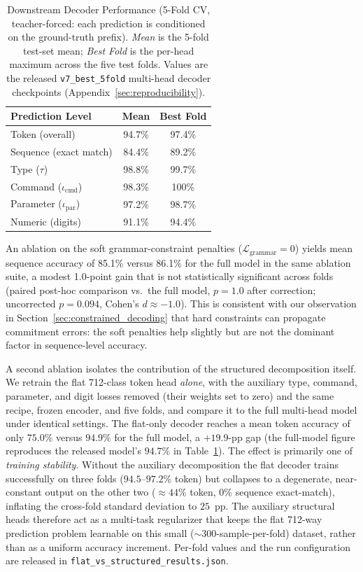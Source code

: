 \documentclass[sensors,article,submit,moreauthors,pdftex]{Definitions/mdpi}
\begin{document}
\begin{table}[htbp]
\centering
\caption{Downstream Decoder Performance (5-Fold CV, teacher-forced: each prediction is conditioned on the ground-truth prefix). \emph{Mean} is the 5-fold test-set mean; \emph{Best Fold} is the per-head maximum across the five test folds. Values are the released \texttt{v7\_best\_5fold} multi-head decoder checkpoints (Appendix~\ref{sec:reproducibility}).}
\label{tab:downstream}
\small
\begin{tabular}{@{}lcc@{}}
\toprule
\textbf{Prediction Level} & \textbf{Mean} & \textbf{Best Fold} \\
\midrule
Token (overall)              & 94.7\% & 97.4\% \\
Sequence (exact match)       & 84.4\% & 89.2\% \\
Type ($\tau$)                & 98.8\% & 99.7\% \\
Command ($\iota_{\text{cmd}}$) & 98.3\% & 100\% \\
Parameter ($\iota_{\text{par}}$) & 97.2\% & 98.7\% \\
Numeric (digits)             & 91.1\% & 94.4\% \\
\bottomrule
\end{tabular}
\normalsize
\end{table}

An ablation on the soft grammar-constraint penalties ($\mathcal{L}_{\text{grammar}} = 0$) yields mean sequence accuracy of 85.1\% versus 86.1\% for the full model in the same ablation suite, a modest 1.0-point gain that is not statistically significant across folds (paired post-hoc comparison vs.\ the full model, $p = 1.0$ after correction; uncorrected $p = 0.094$, Cohen's $d \approx -1.0$). This is consistent with our observation in Section~\ref{sec:constrained_decoding} that hard constraints can propagate commitment errors: the soft penalties help slightly but are not the dominant factor in sequence-level accuracy.

A second ablation isolates the contribution of the structured decomposition itself. We retrain the flat 712-class token head \emph{alone}, with the auxiliary type, command, parameter, and digit losses removed (their weights set to zero) and the same recipe, frozen encoder, and five folds, and compare it to the full multi-head model under identical settings. The flat-only decoder reaches a mean token accuracy of only $75.0\%$ versus $94.9\%$ for the full model, a $+19.9$-pp gap (the full-model figure reproduces the released model's $94.7\%$ in Table~\ref{tab:downstream}). The effect is primarily one of \emph{training stability}. Without the auxiliary decomposition the flat decoder trains successfully on three folds ($94.5$--$97.2\%$ token) but collapses to a degenerate, near-constant output on the other two ($\approx\!44\%$ token, $0\%$ sequence exact-match), inflating the cross-fold standard deviation to $25$~pp. The auxiliary structural heads therefore act as a multi-task regularizer that keeps the flat 712-way prediction problem learnable on this small ($\sim\!300$-sample-per-fold) dataset, rather than as a uniform accuracy increment. Per-fold values and the run configuration are released in \texttt{flat\_vs\_structured\_results.json}.
\end{document}

